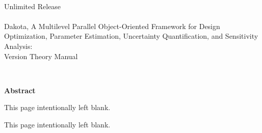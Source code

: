 \documentclass[letterpaper]{book}
\makeatletter
\def\emptypage@emptypage{%
  \hbox{}\vspace*{\fill}
  \begin{center}
    This page intentionally left blank.
  \end{center}
  \vspace{\fill}\newpage%
}%
\def\cleardoublepage{%
  \clearpage%
  \if@twoside%
   \emptypage@emptypage%
  \fi%
}%
\makeatother
\begin{document}
\begin{titlepage}
\setcounter{page}{3}
\begin{center}
{\large \DakotaSANDTheory}\\
{\large Unlimited Release}\\
{\large \DakotaSANDDate}\\

\vspace*{1.5cm}
{\LARGE Dakota, A Multilevel Parallel Object-Oriented Framework for 
Design Optimization, Parameter Estimation, Uncertainty Quantification, 
and Sensitivity Analysis:\\Version \DakotaVersion\space Theory Manual}\\
\vspace*{1cm}

\DakotaAuthorTheorySAND
\\ \vspace*{0.5cm}
\DakotaSNLAddress

\newpage

{\Large \bf Abstract}
\end{center}

\DakotaAbstractShared
\DakotaAbstractTheory

\end{titlepage}

\cleardoublepage
\tableofcontents
\cleardoublepage

%
%










%



\end{document}
